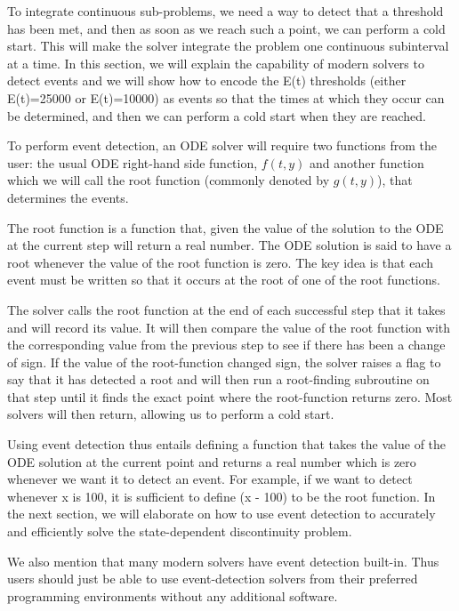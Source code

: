 To integrate continuous sub-problems, we need a way to detect that a threshold has been met, and then as soon as we reach such a point, we can perform a cold start. This will make the solver integrate the problem one continuous subinterval at a time. In this section, we will explain the capability of modern solvers to detect events and we will show how to encode the E(t) thresholds (either E(t)=25000 or E(t)=10000) as events so that the times at which they occur can be determined, and then we can perform a cold start when they are reached.

To perform event detection, an ODE solver will require two functions from the user: the usual ODE right-hand side function, $f(t, y)$ and another function which we will call the root function (commonly denoted by $g(t, y)$), that determines the events.

The root function is a function that, given the value of the solution to the ODE at the current step will return a real number. The ODE solution is said to have a root whenever the value of the root function is zero. The key idea is that each event must be written so that it occurs at the root of one of the root functions.

The solver calls the root function at the end of each successful step that it takes and will record its value. It will then compare the value of the root function with the corresponding value from the previous step to see if there has been a change of sign. If the value of the root-function changed sign, the solver raises a flag to say that it has detected a root and will then run a root-finding subroutine on that step until it finds the exact point where the root-function returns zero. Most solvers will then return, allowing us to perform a cold start.

Using event detection thus entails defining a function that takes the value of the ODE solution at the current point and returns a real number which is zero whenever we want it to detect an event. For example, if we want to detect whenever x is 100, it is sufficient to define (x - 100) to be the root function. In the next section, we will elaborate on how to use event detection to accurately and efficiently solve the state-dependent discontinuity problem.

We also mention that many modern solvers have event detection built-in. Thus users should just be able to use event-detection solvers from their preferred programming environments without any additional software.


